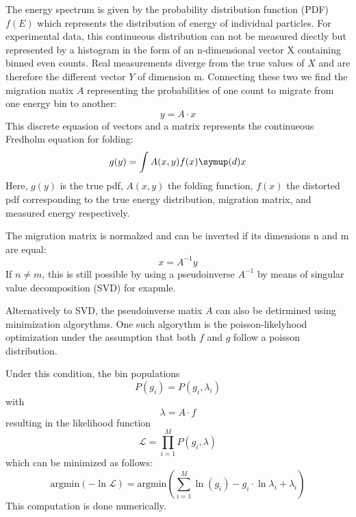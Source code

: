     The energy spectrum is given by the probability distribution function (PDF) $f(E)$ which represents the distribution of energy of individual particles.
    For experimental data, this continueous distribution can not be measured diectly but represented by a histogram in the form of an n-dimensional vector X containing binned even counts.
    Real measurements diverge from the true values of $X$ and are therefore the different vector $Y$ of dimension m.
    Connecting these two we find the migration matix $A$ representing the probabilities of one count to migrate from one energy bin to another:
    \begin{equation}
        y = A \cdot x
        \label{eqn:folding}
    \end{equation} 
    This discrete equasion of vectors and a matrix represents the continueous Fredholm equation for folding:
    \begin{equation}
        g(y)= \int A(x,y)f(x) \symup(d)x 
    \end{equation}
    Here, $g(y)$ is the true pdf, $A(x,y)$ the folding function, $f(x)$ the distorted pdf corresponding to the true energy distribution, migration matrix, and measured energy respectively.

    The migration matrix is normalzed and can be inverted if its dimensions n and m are equal:
    \begin{equation}
        x = A^{-1}y
        \label{eqn:unfolding}
    \end{equation}
    If $n \neq m$, this is still possible by using a pseudoinverse $A^{-1}$ by means of singular value decomposition (SVD) for exapmle.
   
    Alternatively to SVD, the pseudoinverse matix $A$ can also be detirmined using minimization algorythms.
    One such algorythm is the poisson-likelyhood optimization under the assumption that both $f$ and $g$ follow a poisson distribution.

    Under this condition, the bin populations 
    \begin{equation}
        P(g_i) = P(g_i,\lambda_i)
    \end{equation}
    with 
    \begin{equation}
        \lambda = A \cdot f
    \end{equation}
    resulting in the likelihood function
    \begin{equation}
        \mathcal{L} = \prod_{i=1}^M P(g_i,\lambda)
    \end{equation}
    which can be minimized as follows:
    \begin{equation}
        \text{argmin}(- \ln \mathcal{L})=\text{argmin}\left(\sum_{i=1}^M \ln(g_i \!)-g_i \cdot \ln\lambda_i+\lambda_i\right)
        \label{eq:PoissonLikelihood}
    \end{equation}
    This computation is done numerically.

